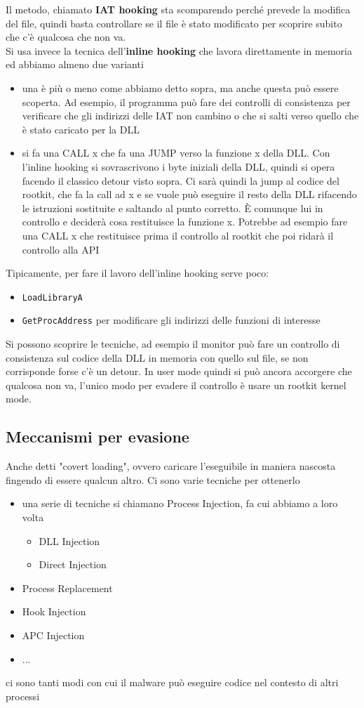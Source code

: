 \documentclass[12pt, oneside]{extbook}
\begin{document}
Il metodo, chiamato \textbf{IAT hooking} sta scomparendo perché prevede la modifica del file, quindi basta controllare se il file è stato modificato per scoprire subito che c'è qualcosa che non va.\\Si usa invece la tecnica dell'\textbf{inline hooking} che lavora direttamente in memoria ed abbiamo almeno due varianti
\begin{itemize}
	\item una è più o meno come abbiamo detto sopra, ma anche questa può essere scoperta. Ad esempio, il programma può fare dei controlli di consistenza per verificare che gli indirizzi delle IAT non cambino o che si salti verso quello che è stato caricato per la DLL
	\item si fa una CALL x che fa una JUMP verso la funzione x della DLL. Con l'inline hooking si sovrascrivono i byte iniziali della DLL, quindi si opera facendo il classico detour visto sopra. Ci sarà quindi la jump al codice del rootkit, che fa la call ad x e se vuole può eseguire il resto della DLL rifacendo le istruzioni sostituite e saltando al punto corretto. È comunque lui in controllo e deciderà cosa restituisce la funzione x. Potrebbe ad esempio fare una CALL x che restituisce prima il controllo al rootkit che poi ridarà il controllo alla API
\end{itemize}
Tipicamente, per fare il lavoro dell'inline hooking serve poco:
\begin{itemize}
	\item \texttt{LoadLibraryA}
	\item \texttt{GetProcAddress} per modificare gli indirizzi delle funzioni di interesse
\end{itemize}
Si possono scoprire le tecniche, ad esempio il monitor può fare un controllo di consistenza sul codice della DLL in memoria con quello sul file, se non corrisponde forse c'è un detour. In user mode quindi si può ancora accorgere che qualcosa non va, l'unico modo per evadere il controllo è usare un rootkit kernel mode.
\subsection{Meccanismi per evasione}
Anche detti "covert loading", ovvero caricare l'eseguibile in maniera nascosta fingendo di essere qualcun altro. Ci sono varie tecniche per ottenerlo
\begin{itemize}
	\item una serie di tecniche si chiamano Process Injection, fa cui abbiamo a loro volta
	\begin{itemize}
		\item DLL Injection
		\item Direct Injection
	\end{itemize}
	\item Process Replacement
	\item Hook Injection
	\item APC Injection
	\item ...
\end{itemize}
ci sono tanti modi con cui il malware può eseguire codice nel contesto di altri processi
\end{document}
